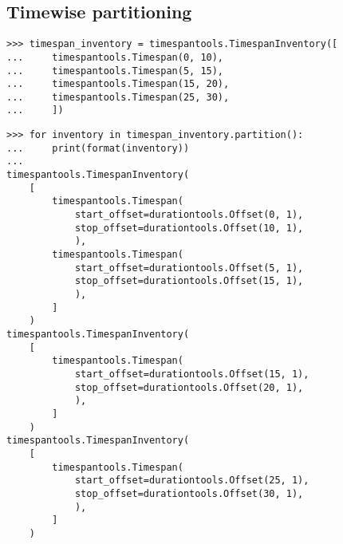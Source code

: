 \begin{comment}
Timespan.split_at_offsets()
\end{comment}

\subsection{Timewise partitioning}

\begin{comment}
<abjad>
timespan_inventory = timespantools.TimespanInventory([
    timespantools.Timespan(0, 10),
    timespantools.Timespan(5, 15),
    timespantools.Timespan(15, 20),
    timespantools.Timespan(25, 30),
    ])
</abjad>
\end{comment}

\begin{singlespacing}
\vspace{-0.5\baselineskip}
\begin{lstlisting}
>>> timespan_inventory = timespantools.TimespanInventory([
...     timespantools.Timespan(0, 10),
...     timespantools.Timespan(5, 15),
...     timespantools.Timespan(15, 20),
...     timespantools.Timespan(25, 30),
...     ])
\end{lstlisting}
\end{singlespacing}

\begin{comment}
<abjad>
for inventory in timespan_inventory.partition():
    print(format(inventory))

</abjad>
\end{comment}

\begin{singlespacing}
\vspace{-0.5\baselineskip}
\begin{lstlisting}
>>> for inventory in timespan_inventory.partition():
...     print(format(inventory))
...
timespantools.TimespanInventory(
    [
        timespantools.Timespan(
            start_offset=durationtools.Offset(0, 1),
            stop_offset=durationtools.Offset(10, 1),
            ),
        timespantools.Timespan(
            start_offset=durationtools.Offset(5, 1),
            stop_offset=durationtools.Offset(15, 1),
            ),
        ]
    )
timespantools.TimespanInventory(
    [
        timespantools.Timespan(
            start_offset=durationtools.Offset(15, 1),
            stop_offset=durationtools.Offset(20, 1),
            ),
        ]
    )
timespantools.TimespanInventory(
    [
        timespantools.Timespan(
            start_offset=durationtools.Offset(25, 1),
            stop_offset=durationtools.Offset(30, 1),
            ),
        ]
    )
\end{lstlisting}
\end{singlespacing}

